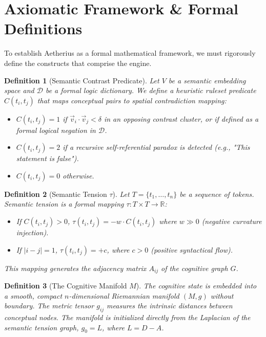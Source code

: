 \documentclass[11pt,a4paper,twocolumn]{article}
\newtheorem{definition}{Definition}[section]
\begin{document}
\section{Axiomatic Framework \& Formal Definitions}

To establish Aetherius as a formal mathematical framework, we must rigorously define the constructs that comprise the engine.

\begin{definition}[Semantic Contrast Predicate]
Let $V$ be a semantic embedding space and $\mathcal{D}$ be a formal logic dictionary. We define a heuristic ruleset predicate $C(t_i, t_j)$ that maps conceptual pairs to spatial contradiction mapping:
\begin{itemize}[noitemsep]
    \item $C(t_i, t_j) = 1$ if $\vec{v}_i \cdot \vec{v}_j < \delta$ in an opposing contrast cluster, or if defined as a formal logical negation in $\mathcal{D}$.
    \item $C(t_i, t_j) = 2$ if a recursive self-referential paradox is detected (e.g., "This statement is false").
    \item $C(t_i, t_j) = 0$ otherwise.
\end{itemize}
\end{definition}

\begin{definition}[Semantic Tension $\tau$]
Let $T = \{t_1, \dots, t_n\}$ be a sequence of tokens. Semantic tension is a formal mapping $\tau : T \times T \to \mathbb{R}$:
\begin{itemize}[noitemsep]
    \item If $C(t_i, t_j) > 0$, $\tau(t_i, t_j) = -w \cdot C(t_i, t_j)$ where $w \gg 0$ (negative curvature injection). 
    \item If $|i - j| = 1$, $\tau(t_i, t_j) = +c$, where $c > 0$ (positive syntactical flow).
\end{itemize}
This mapping generates the adjacency matrix $A_{ij}$ of the cognitive graph $G$.
\end{definition}

\begin{definition}[The Cognitive Manifold $M$]
The cognitive state is embedded into a smooth, compact $n$-dimensional Riemannian manifold $(M, g)$ without boundary. The metric tensor $g_{ij}$ measures the intrinsic distances between conceptual nodes. The manifold is initialized directly from the Laplacian of the semantic tension graph, $g_0 = L$, where $L = D - A$.
\end{definition}
\end{document}
